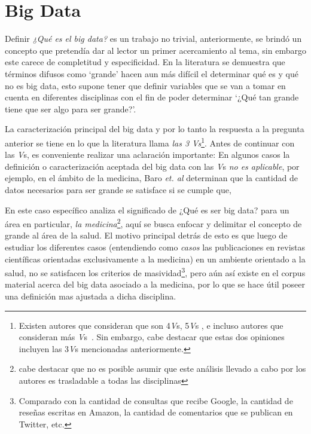 \section{Big Data}
\label{sec:big_data}

Definir \textit{¿Qué es el big data?} es un trabajo no trivial, anteriormente, se brindó
un concepto que pretendía dar al lector un primer acercamiento al tema, sin
embargo este carece de completitud y especificidad. En
la literatura se demuestra que términos difusos como `grande' hacen aun más
difícil el determinar qué es y qué no es big data, esto supone tener que
definir variables que se van a tomar en cuenta en diferentes disciplinas con el
fin de poder determinar `¿Qué tan grande tiene que ser algo para ser grande?'.

La caracterización principal del big data y por lo tanto la respuesta a la
pregunta anterior se tiene en lo que la literatura llama \textit{las 3
Vs}\footnote{Existen autores que consideran que son
4\textit{V}s\cite{wibowo2019, ghasemaghaei2019}, 5\textit{V}s
\cites{hitzler2013, yin2015}, e incluso autores que
consideran más \textit{V}s~\cite{bonner2017}. Sin embargo, cabe
destacar que estas dos opiniones incluyen las 3\textit{V}s mencionadas
anteriormente.}\cites{bd_ibm, bd_aws, bd_oracle}. Antes de continuar con las \textit{V}s, es conveniente realizar una
aclaración importante: En algunos casos la definición o caracterización aceptada del big data
con las \textit{V}s \textit{no es aplicable}, por ejemplo, en el ámbito de la medicina, Baro {\it et. al}
\cite{baro2015} determinan que la cantidad de datos necesarios para ser grande
se satisface si se cumple que,



En este caso específico analiza el significado de ¿Qué es ser big data? para un
área en particular, \textit{la medicina}\footnote{cabe destacar que no es posible asumir que este
análisis llevado a cabo por los autores es trasladable a todas las
disciplinas}, aquí se busca enfocar y delimitar el concepto de
grande al área de la salud. El motivo principal detrás de esto es que luego de
estudiar los diferentes casos (entendiendo como \textit{casos} las
publicaciones en revistas científicas orientadas exclusivamente a la medicina)%
en un ambiente orientado a la salud, no se satisfacen los criterios de
masividad\footnote{Comparado con la cantidad de consultas que recibe Google, la
cantidad de reseñas escritas en Amazon, la cantidad de comentarios que se
publican en Twitter, etc.}, pero aún así existe en el corpus material acerca
del big data asociado a la medicina, por lo que se hace útil poseer una
definición mas ajustada a dicha disciplina.






